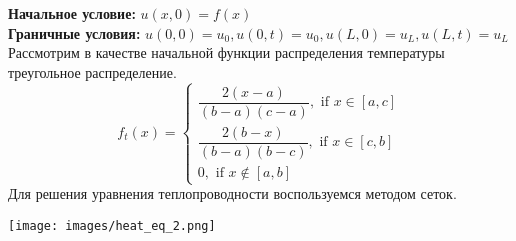 \textbf{Начальное условие:} $u(x,0)=f(x)$\\
\textbf{Граничные условия:} $u(0,0)=u_0,u(0,t)=u_0,u(L,0)=u_L,u(L,t)=u_L$
Рассмотрим в качестве начальной функции распределения температуры треугольное распределение.
\begin{equation}
  f_t(x)=\begin{cases}
    \dfrac{2(x-a)}{(b-a)(c-a)}, \text{ if } x\in[a,c]\\
    \dfrac{2(b-x)}{(b-a)(b-c)}, \text{ if } x\in[c,b]\\
    0, \text{ if } x\notin[a,b]
  \end{cases}
\end{equation}
Для решения уравнения теплопроводности воспользуемся методом сеток.
\begin{center}
  \texttt{[image: images/heat\_eq\_2.png]}
\end{center}


